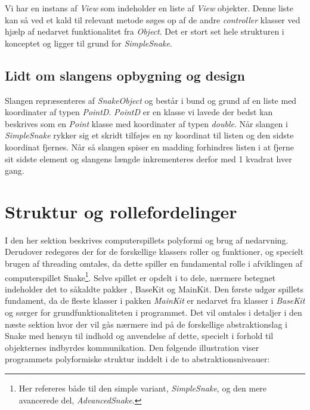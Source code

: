 \documentclass[]{article}
\begin{document}
Vi har en instans af \textit{View} som indeholder en liste af \textit{View} objekter. Denne liste kan så ved et kald til relevant metode søges op af de andre \textit{controller} klasser ved hjælp af nedarvet funktionalitet fra \textit{Object}. Det er stort set hele strukturen i konceptet og ligger til grund for \textit{SimpleSnake}.


\subsection{Lidt om slangens opbygning og design}

Slangen repræsenteres af \textit{SnakeObject} og består i bund og grund af en liste med koordinater af typen \textit{PointD}. \textit{PointD} er en klasse vi lavede der bedst kan beskrives som en \textit{Point} klasse med koordinater af typen \textit{double}. Når slangen i \textit{SimpleSnake} rykker sig et skridt tilføjes en ny koordinat til listen og den sidste koordinat fjernes. Når så slangen spiser en madding forhindres listen i at fjerne sit sidste element og slangens længde inkrementeres derfor med 1 kvadrat hver gang.


\section{Struktur og rollefordelinger}

I den her sektion beskrives computerspillets polyformi og brug af nedarvning. Derudover redegøres der for de forskellige klassers roller og funktioner, og specielt brugen af threading omtales, da dette spiller en fundamental rolle i afviklingen af computerspillet Snake\footnote{Her refereres både til den simple variant, \textit{SimpleSnake}, og den mere avancerede del, \textit{AdvancedSnake}.}.
Selve spillet er opdelt i to dele, nærmere betegnet indeholder det to såkaldte pakker , BaseKit og MainKit. Den første udgør spillets fundament, da de fleste klasser i pakken \textit{MainKit} er nedarvet fra klasser i \textit{BaseKit} og sørger for grundfunktionaliteten i programmet. Det vil omtales i detaljer i den næste sektion hvor der vil gås nærmere ind på de forskellige abstraktionslag i Snake med hensyn til indhold og anvendelse af dette, specielt i forhold til objekternes indbyrdes kommunikation. Den følgende illustration viser programmets polyformiske struktur inddelt i de to abstraktionsniveauer:
\end{document}
